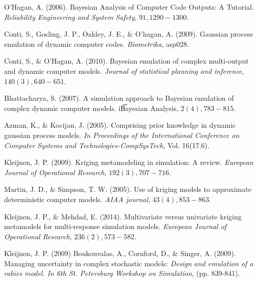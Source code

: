\begin{thebibliography}{94}
 O'Hagan, A. (2006). Bayesian Analysis of Computer Code Outputs: A Tutorial. {\it Reliability Engineering and System Safety}, $91, 1290-1300$.

 Conti, S., Gosling, J. P., Oakley, J. E., \& O'hagan, A. (2009). Gaussian process emulation of dynamic computer codes. {\it Biometrika}, asp028.


 Conti, S., \& O’Hagan, A. (2010). Bayesian emulation of complex multi-output and dynamic computer models. {\it Journal of statistical planning and inference}, $140(3), 640-651$.

 Bhattacharya, S. (2007). A simulation approach to Bayesian emulation of complex dynamic computer models. {i\t Bayesian Analysis}, $2(4), 783-815$.


 Azman, K., \& Kocijan, J. (2005). Comprising prior knowledge in dynamic gaussian process models. {\it In Proceedings of the International Conference on Computer Systems and Technologies-CompSysTech}, Vol. 16(17.6).

 Kleijnen, J. P. (2009). Kriging metamodeling in simulation: A review. {\it European Journal of Operational Research}, $192(3), 707-716$.

 Martin, J. D., \& Simpson, T. W. (2005). Use of kriging models to approximate deterministic computer models. {\it AIAA journal}, $43(4), 853-863$.

 Kleijnen, J. P., \& Mehdad, E. (2014). Multivariate versus univariate kriging metamodels for multi-response simulation models. {\it European Journal of Operational Research}, $236(2), 573-582$.

 Kleijnen, J. P. (2009) Boukouvalas, A., Cornford, D., \& Singer, A. (2009). Managing uncertainty in complex stochastic models: {\it Design and emulation of a rabies model. In 6th St. Petersburg Workshop on Simulation}, (pp. 839-841).


\end{thebibliography}
